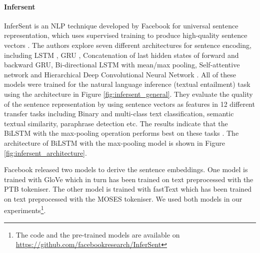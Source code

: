 \paragraph{Infersent}
InferSent is an NLP technique developed by Facebook for universal sentence representation, which uses supervised training to produce high-quality sentence vectors \autocite{conneau-EtAl:2017:EMNLP2017}. The authors explore seven different architectures for sentence
encoding, including LSTM \autocite{10.1162/neco.1997.9.8.1735}, GRU \autocite{Chung2014EmpiricalEO}, Concatenation of last hidden states of forward and backward GRU, Bi-directional LSTM \autocite{650093} with mean/max pooling, Self-attentive network and Hierarchical Deep Convolutional Neural Network \autocite{conneau-EtAl:2017:EMNLP2017}. All of these models were trained for the natural language inference (textual entailment) task using the architecture in Figure \ref{fig:infersent_general}. They evaluate the quality of the sentence representation by using sentence vectors as features in 12 different transfer tasks including Binary and multi-class text classification, semantic textual similarity, paraphrase detection etc. The results indicate that the BiLSTM with the max-pooling operation performs best on these tasks  \autocite{conneau-EtAl:2017:EMNLP2017}. The architecture of BiLSTM with the max-pooling model is shown in Figure \ref{fig:infersent_architecture}.

Facebook released two models to derive the sentence embeddings. One model is trained with GloVe \autocite{pennington-etal-2014-glove} which in turn has been trained on text preprocessed with the PTB tokeniser. The other model is trained with fastText \autocite{mikolov-etal-2018-advances}  which has been trained on text preprocessed with the MOSES tokeniser. We used both models in our experiments\footnote{The code and the pre-trained models are available on \url{https://github.com/facebookresearch/InferSent}}.



